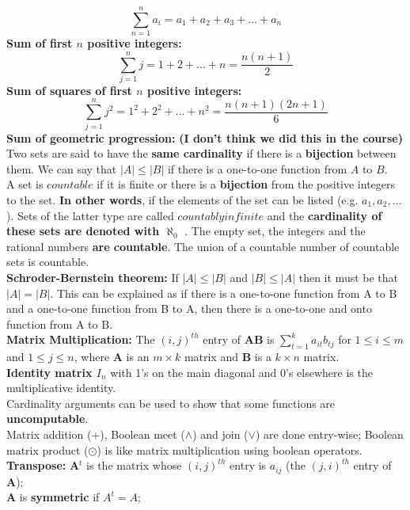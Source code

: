 \documentclass[12pt]{article}
\begin{document}
$$
\sum_{n=1}^{n} a_i = a_1 + a_2 + a_3 + ... + a_n
$$
\textbf{Sum of first $n$ positive integers:} 
$$
\sum_{j=1}^{n} j = 1 + 2 + ... + n = \frac{n(n +1)}{2}
$$
\textbf{Sum of squares of first $n$ positive integers:}
$$
\sum_{j=1}^{n} j^2 = 1^2 + 2^2 + ... + n^2 = \frac{n(n +1)(2n+1)}{6}
$$
\textbf{Sum of geometric progression:}
\textbf{(I don't think we did this in the course)}\\ 
\newpage
Two sets are said to have the \textbf{same cardinality} if there is a \textbf{bijection} between them. We can say that $|A| \leq |B|$ if there is a one-to-one function from $A$ to $B$. \\
A set is $countable$ if it is finite or there is a \textbf{bijection} from the positive integers to the set. \textbf{In other words}, if the elements of the set can be listed (e.g. $a_1, a_2, ...$). Sets of the latter type are called $countably infinite$ and the \textbf{cardinality of these sets are denoted with $\aleph_0$ }. The empty set, the integers and the rational numbers \textbf{are countable}. The union of a countable number of countable sets is countable. \\
\textbf{Schroder-Bernstein theorem:} If $|A| \leq |B|$ and $|B| \leq |A|$ then it must be that $|A| = |B|$. This can be explained as if there is a one-to-one function from A to B and a one-to-one function from B to A, then there is a one-to-one and onto function from A to B. \\
\textbf{Matrix Multiplication:} The $(i,j)^{th}$ entry of \textbf{AB} is $\sum_{t=1}^k a_{it}b_{tj}$ for $1 \leq i \leq m$ and $1 \leq j \leq n$, where \textbf{A} is an $m \times k$ matrix and \textbf{B} is a $k \times n$ matrix. \\
\textbf{Identity matrix $I_n$} with 1's on the main diagonal and 0's elsewhere is the multiplicative identity. \\
Cardinality arguments can be used to show that some functions are \textbf{uncomputable}. \\
Matrix addition (+), Boolean meet ($\wedge$) and join ($\vee$) are done entry-wise; Boolean matrix product ($\odot$) is like matrix multiplication using boolean operators. \\
\textbf{Transpose:} \textbf{A}$^t$ is the matrix whose $(i,j)^{th}$ entry is $a_{ij}$ (the $(j,i)^{th}$ entry of \textbf{A}); \\
\textbf{A} is \textbf{symmetric} if \textbf{$A^t=A$};
\newpage
\end{document}
